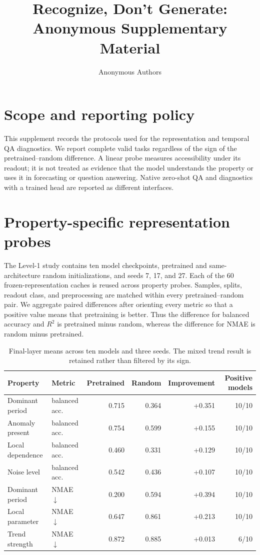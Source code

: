 \documentclass{article}
\title{Recognize, Don't Generate:\\ Anonymous Supplementary Material}
\author{Anonymous Authors}
\date{}
\begin{document}
\maketitle

\section{Scope and reporting policy}

This supplement records the protocols used for the representation and temporal
QA diagnostics.  We report complete valid tasks regardless of the sign of the
pretrained--random difference.  A linear probe measures accessibility under
its readout; it is not treated as evidence that the model understands the
property or uses it in forecasting or question answering.  Native zero-shot QA
and diagnostics with a trained head are reported as different interfaces.

\section{Property-specific representation probes}

The Level-1 study contains ten model checkpoints, pretrained and
same-architecture random initializations, and seeds 7, 17, and 27.  Each of the
60 frozen-representation caches is reused across property probes.  Samples,
splits, readout class, and preprocessing are matched within every
pretrained--random pair.  We aggregate paired differences after orienting every
metric so that a positive value means that pretraining is better.  Thus the
difference for balanced accuracy and $R^2$ is pretrained minus random, whereas
the difference for NMAE is random minus pretrained.

\begin{table}[h]
\centering
\small
\begin{tabular}{llrrrr}
\toprule
Property & Metric & Pretrained & Random & Improvement & Positive models \\
\midrule
Dominant period & balanced acc. & 0.715 & 0.364 & +0.351 & 10/10 \\
Anomaly present & balanced acc. & 0.754 & 0.599 & +0.155 & 10/10 \\
Local dependence & balanced acc. & 0.460 & 0.331 & +0.129 & 10/10 \\
Noise level & balanced acc. & 0.542 & 0.436 & +0.107 & 10/10 \\
Dominant period & NMAE $\downarrow$ & 0.200 & 0.594 & +0.394 & 10/10 \\
Local parameter & NMAE $\downarrow$ & 0.647 & 0.861 & +0.213 & 10/10 \\
Trend strength & NMAE $\downarrow$ & 0.872 & 0.885 & +0.013 & 6/10 \\
\bottomrule
\end{tabular}
\caption{Final-layer means across ten models and three seeds.  The mixed trend
result is retained rather than filtered by its sign.}
\end{table}
\end{document}
